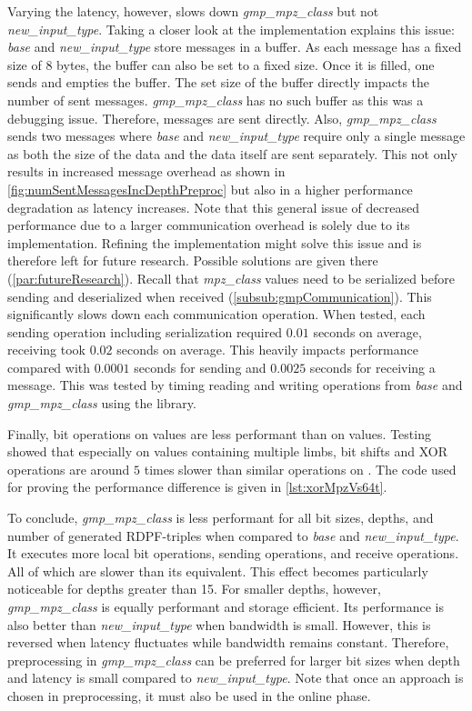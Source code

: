 Varying the latency, however, slows down \textit{gmp\_mpz\_class} but not \textit{new\_input\_type}.
Taking a closer look at the implementation explains this issue:
\textit{base} and \textit{new\_input\_type} store messages in a buffer.
As each message has a fixed size of 8 bytes, the buffer can also be set to a fixed size.
Once it is filled, one sends and empties the buffer.
The set size of the buffer directly impacts the number of sent messages.
\textit{gmp\_mpz\_class} has no such buffer as this was a debugging issue.
Therefore, messages are sent directly.
Also, \textit{gmp\_mpz\_class} sends two messages where \textit{base} and \textit{new\_input\_type} require only a single message as both the size of the data and the data itself are sent separately.
This not only results in increased message overhead as shown in \ref{fig:numSentMessagesIncDepthPreproc} but also in a higher performance degradation as latency increases.
Note that this general issue of decreased performance due to a larger communication overhead is solely due to its implementation.
Refining the implementation might solve this issue and is therefore left for future research.
Possible solutions are given there (\ref{par:futureResearch}).
Recall that \textit{mpz\_class} values need to be serialized before sending and deserialized when received (\ref{subsub:gmpCommunication}).
This significantly slows down each communication operation.
When tested, each sending operation including serialization required $0.01$ seconds on average, receiving took $0.02$ seconds on average.
This heavily impacts performance compared with $0.0001$ seconds for sending and $0.0025$ seconds for receiving a  message.
This was tested by timing reading and writing operations from \textit{base} and \textit{gmp\_mpz\_class} using the  library.

Finally, bit operations on  values are less performant than on  values.
Testing showed that especially on  values containing multiple limbs, bit shifts and XOR operations are around $5$ times slower than similar operations on .
The code used for proving the performance difference is given in \ref{lst:xorMpzVs64t}.

To conclude, \textit{gmp\_mpz\_class} is less performant for all bit sizes, depths, and number of generated RDPF-triples when compared to \textit{base} and \textit{new\_input\_type}.
It executes more local bit operations, sending operations, and receive operations.
All of which are slower than its  equivalent.
This effect becomes particularly noticeable for depths greater than 15.
For smaller depths, however, \textit{gmp\_mpz\_class} is equally performant and storage efficient.
Its performance is also better than \textit{new\_input\_type} when bandwidth is small.
However, this is reversed when latency fluctuates while bandwidth remains constant.
Therefore, preprocessing in \textit{gmp\_mpz\_class} can be preferred for larger bit sizes when depth and latency is small compared to \textit{new\_input\_type}.
Note that once an approach is chosen in preprocessing, it must also be used in the online phase.

